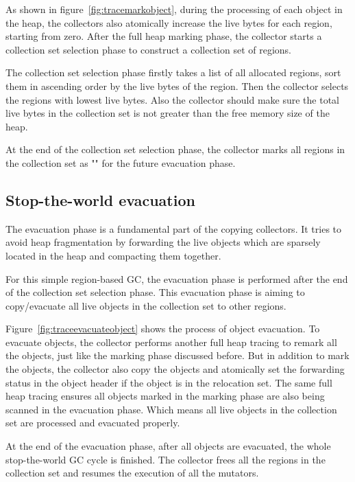 As shown in figure~\ref{fig:tracemarkobject}, during the processing of each object in the heap,
the collectors also atomically increase the live bytes for each region, starting from zero.
After the full heap marking phase, the collector starts a collection set selection phase to construct
a collection set of regions.

The collection set selection phase firstly takes a list of all allocated regions,
sort them in ascending order by the live bytes of the region.
Then the collector selects the regions with lowest live bytes.
Also the collector should make sure the total live bytes in the collection set is not
greater than the free memory size of the heap.

At the end of the collection set selection phase, the collector marks all regions
in the collection set as "" for the future evacuation phase.

\subsection{Stop-the-world evacuation}

The evacuation phase is a fundamental part of the copying collectors.
It tries to avoid heap fragmentation by forwarding the live objects which are sparsely located in the heap
and compacting them together.

For this simple region-based GC, the evacuation phase is performed after the end of the collection set selection phase.
This evacuation phase is aiming to copy/evacuate all live objects in the collection set to other
regions.

Figure~\ref{fig:traceevacuateobject} shows the process of object evacuation.
To evacuate objects, the collector performs another full heap tracing to remark all the objects,
just like the marking phase discussed before.
But in addition to mark the objects, the collector also copy the objects and atomically set the forwarding status in the object header
if the object is in the relocation set.
The same full heap tracing ensures all objects marked in the marking phase are also being scanned in the evacuation phase.
Which means all live objects in the collection set are processed and evacuated properly.

At the end of the evacuation phase, after all objects are evacuated, the whole stop-the-world GC cycle is finished.
The collector frees all the regions in the collection set and resumes the execution of all the mutators.

